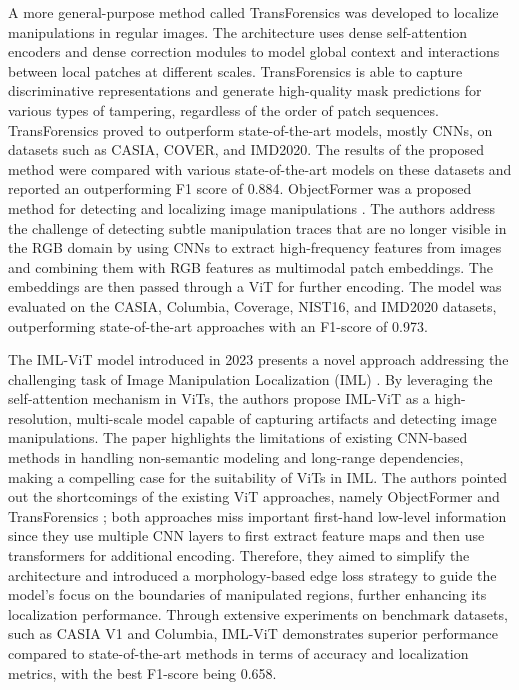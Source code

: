  A more general-purpose method called TransForensics \cite{hao2021transforensics} was developed to localize manipulations in regular images. The architecture uses dense self-attention encoders and dense correction modules to model global context and interactions between local patches at different scales. TransForensics is able to capture discriminative representations and generate high-quality mask predictions for various types of tampering, regardless of the order of patch sequences. TransForensics proved to outperform state-of-the-art models, mostly CNNs, on datasets such as CASIA, COVER, and IMD2020. The results of the proposed method were compared with various state-of-the-art models on these datasets and reported an outperforming F1 score of 0.884. ObjectFormer was a proposed method for detecting and localizing image manipulations \cite{wang2022objectformer}. The authors address the challenge of detecting subtle manipulation traces that are no longer visible in the RGB domain by using CNNs to extract high-frequency features from images and combining them with RGB features as multimodal patch embeddings. The embeddings are then passed through a ViT for further encoding. The model was evaluated on the CASIA, Columbia, Coverage, NIST16, and IMD2020 datasets, outperforming state-of-the-art approaches with an F1-score of 0.973.

The IML-ViT model introduced in 2023 presents a novel approach addressing the challenging task of Image Manipulation Localization (IML) \cite{ma2023imlvit}. By leveraging the self-attention mechanism in ViTs, the authors propose IML-ViT as a high-resolution, multi-scale model capable of capturing artifacts and detecting image manipulations. The paper highlights the limitations of existing CNN-based methods in handling non-semantic modeling and long-range dependencies, making a compelling case for the suitability of ViTs in IML. The authors pointed out the shortcomings of the existing ViT approaches, namely ObjectFormer \cite{wang2022objectformer} and TransForensics \cite{hao2021transforensics}; both approaches miss important first-hand low-level information since they use multiple CNN layers to first extract feature maps and then use transformers for additional encoding. Therefore, they aimed to simplify the architecture and introduced a morphology-based edge loss strategy to guide the model's focus on the boundaries of manipulated regions, further enhancing its localization performance. Through extensive experiments on benchmark datasets, such as CASIA V1 and Columbia, IML-ViT demonstrates superior performance compared to state-of-the-art methods in terms of accuracy and localization metrics, with the best F1-score being 0.658.


